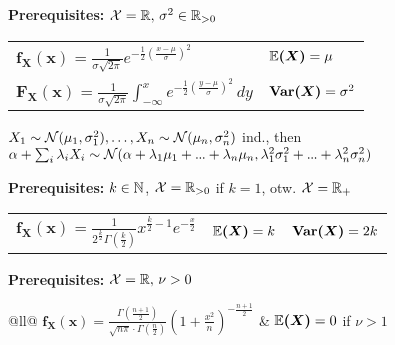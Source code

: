 \begin{cdefinition*}
  \textbf{Prerequisites:} \(\operatorname{\mathcal{X}} = \mathbb{R}, \, \sigma^2 \in \mathbb{R}_{>0}\) \\
  \begin{tabularx}{\linewidth}{@{}ll@{}}
    \(\bm{f_X(x)} = \frac{1}{\sigma\sqrt{2 \pi}}e^{-\frac{1}{2}\left(\frac{x - \mu}{\sigma}\right)^2}\) & \(\bm{\mathbb{E}(X)} = \mu\) \\
    \(\bm{F_X(x)} = \frac{1}{\sigma\sqrt{2 \pi}}\int_{-\infty}^xe^{-\frac{1}{2}\left(\frac{y - \mu}{\sigma}\right)^2} \, dy\) & \(\bm{\Var(X)} = \sigma^2\)
  \end{tabularx}
\end{cdefinition*}

\begin{lemma}
  \(X_1 \sim \operatorname{\mathcal{N}}(\mu_1, \sigma_1^2), \ldots, X_n \sim \operatorname{\mathcal{N}}(\mu_n, \sigma_n^2)\) ind., then \(\alpha + \sum_i \lambda_i X_i \sim \Normal(\alpha + \lambda_1 \mu_1 + \sdots + \lambda_n \mu_n, \lambda_1^2 \sigma_1^2 + \sdots + \lambda_n^2 \sigma_n^2)\)
\end{lemma}

\begin{cdefinition*}
  \textbf{Prerequisites:} \(k \in \mathbb{N}\), \(\operatorname{\mathcal{X}} = \mathbb{R}_{>0}\) if \(k = 1\), otw. \(\operatorname{\mathcal{X}} = \mathbb{R}_+\) \\
  \begin{tabularx}{\linewidth}{@{}lll@{}}
    \(\bm{f_X(x)} = \frac{1}{2^{\frac{k}{2}}\Gamma(\frac{k}{2})} x^{\frac{k}{2}-1}e^{-\frac{x}{2}}\) & \(\bm{\mathbb{E}(X)} = k\) & \(\bm{\Var(X)} = 2k\)
  \end{tabularx}
\end{cdefinition*}

\begin{cdefinition*}
  \textbf{Prerequisites:} \(\operatorname{\mathcal{X}} = \mathbb{R}, \, \nu > 0\) \\
  \begin{tabularx}{\linewidth}{@{}ll@{}}
    \(\bm{f_X(x)} = \frac{\Gamma\left(\frac{n+1}{2}\right)}{\sqrt{n\pi} \cdot \Gamma(\frac{n}{2})} \left(1+\frac{x^2}{n}\right)^{-\frac{n+1}{2}}\) & \(\bm{\mathbb{E}(X)} = 0 \) if \(\nu > 1\) \\
  \end{tabularx}
\end{cdefinition*}

